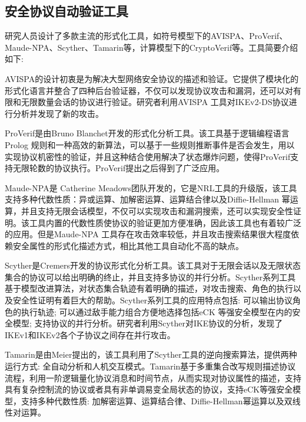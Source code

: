 

\subsection{安全协议自动验证工具}
研究人员设计了多款主流的形式化工具，如符号模型下的AVISPA\cite{Armando2005b}、ProVerif\cite{Blanchet2001}、Maude-NPA\cite{Escobar2009}、Scyther\cite{Cremers2008}、Tamarin\cite{Meier2013b}等，计算模型下的CryptoVerif\cite{blanchet2007cryptoverif}等。工具简要介绍如下:

AVISPA的设计初衷是为解决大型网络安全协议的描述和验证。它提供了模块化的形式化语言并整合了四种后台验证器\cite{Armando2005b}，不仅可以发现协议攻击和漏洞，还可以对有限和无限数量会话的协议进行验证。研究者利用AVISPA 工具对IKEv2-DS协议进行分析并发现了新的攻击\cite{Armando2005c}。

ProVerif是由Bruno Blanchet开发的形式化分析工具。该工具基于逻辑编程语言Prolog 规则和一种高效的新算法，可以基于一些规则推断事件是否会发生，用以实现协议机密性的验证，并且这种结合使用解决了状态爆炸问题，使得ProVerif支持无限轮数的协议执行。ProVerif提出之后得到了广泛应用\cite{Cheval2013a}\cite{Kusters2009a}。

Maude-NPA是 Catherine Meadows团队开发的，它是NRL工具的升级版，该工具支持多种代数性质：异或运算、加解密运算、运算结合律以及Diffie-Hellman 幂运算，并且支持无限会话模型，不仅可以实现攻击和漏洞搜索，还可以实现安全性证明。该工具内置的代数性质使协议的验证更加方便准确，因此该工具也有着较广泛的应用\cite{Escobar2011}。但是Maude-NPA 工具存在攻击效率较低，并且攻击搜索结果很大程度依赖安全属性的形式化描述方式，相比其他工具自动化不高的缺点。

Scyther是Cremers开发的协议形式化分析工具。该工具对于无限会话以及无限状态集合的协议可以给出明确的终止，并且支持多协议的并行分析。Scyther系列工具基于模型改进算法，对状态集合轨迹有着明确的描述，对攻击搜索、角色的执行以及安全性证明有着巨大的帮助。Scyther系列工具的应用特点包括: 可以输出协议角色的执行轨迹; 可以通过敌手能力组合方便地选择包括eCK 等强安全模型在内的安全模型; 支持协议的并行分析。研究者利用Scyther对IKE协议的分析，发现了IKEv1和IKEv2各个子协议之间存在并行攻击\cite{Cremers2008}\cite{Raza2012a}。

Tamarin是由Meier提出的，该工具利用了Scyther工具的逆向搜索算法，提供两种运行方式: 全自动分析和人机交互模式。Tamarin基于多重集合改写规则描述协议流程，利用一阶逻辑量化协议消息和时间节点，从而实现对协议属性的描述，支持具有复杂控制流的协议或者具有非单调易变全局状态的协议，支持eCK等强安全模型，支持多种代数性质: 加解密运算、运算结合律、Diffie-Hellman幂运算以及双线性对运算。

